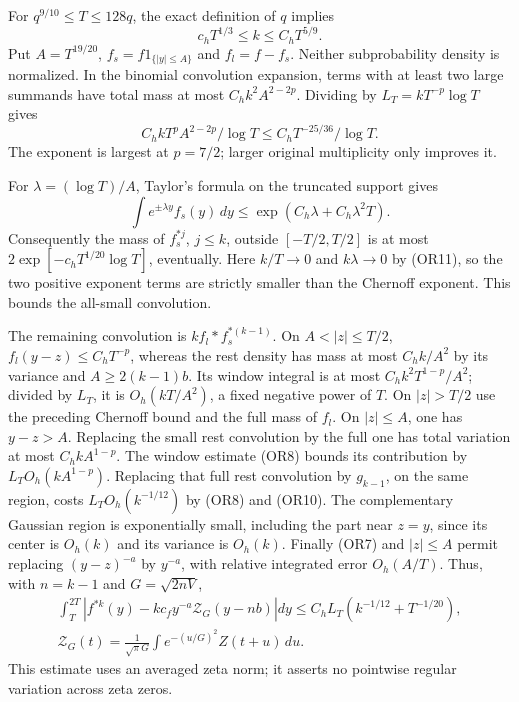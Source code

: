 For \(q^{9/10}\leq T\leq128q\), the exact definition of \(q\) implies
\[
 c_hT^{1/3}\leq k\leq C_hT^{5/9}.                    \tag{OR11}
\]
Put \(A=T^{19/20}\), \(f_s=f1_{\{|y|\leq A\}}\) and \(f_l=f-f_s\).
Neither subprobability density is normalized.  In the binomial
convolution expansion, terms with at least two large summands have
total mass at most \(C_hk^2A^{2-2p}\).  Dividing by
\(L_T=kT^{-p}\log T\) gives
\[
 C_h kT^pA^{2-2p}/\log T
 \leq C_hT^{-25/36}/\log T.                           \tag{OR12}
\]
The exponent is largest at \(p=7/2\); larger original multiplicity
only improves it.

For \(\lambda=(\log T)/A\), Taylor's formula on the truncated support
gives
\[
 \int e^{\pm\lambda y}f_s(y)\,dy
 \leq\exp(C_h\lambda+C_h\lambda^2T).
\]
Consequently the mass of \(f_s^{*j}\), \(j\leq k\), outside
\([-T/2,T/2]\) is at most
\(2\exp[-c_hT^{1/20}\log T]\), eventually.  Here
\(k/T\to0\) and \(k\lambda\to0\) by (OR11), so the two positive
exponent terms are strictly smaller than the Chernoff exponent.
This bounds the all-small convolution.

The remaining convolution is \(k f_l*f_s^{*(k-1)}\).
On \(A<|z|\leq T/2\), \(f_l(y-z)\leq C_hT^{-p}\), whereas the
rest density has mass at most \(C_h k/A^2\) by its variance and
\(A\geq2(k-1)b\).  Its window integral is at most
\(C_hk^2T^{1-p}/A^2\); divided by \(L_T\), it is
\(O_h(kT/A^2)\), a fixed negative power of \(T\).
On \(|z|>T/2\) use the preceding Chernoff bound and the full mass
of \(f_l\).  On \(|z|\leq A\), one has \(y-z>A\).
Replacing the small rest convolution by the full one has total
variation at most \(C_hkA^{1-p}\).  The window estimate (OR8) bounds
its contribution by \(L_TO_h(kA^{1-p})\).
Replacing that full rest convolution by \(g_{k-1}\), on the same
region, costs \(L_TO_h(k^{-1/12})\) by (OR8) and (OR10).
The complementary Gaussian region is exponentially small, including
the part near \(z=y\), since its center is \(O_h(k)\) and its
variance is \(O_h(k)\).
Finally (OR7) and \(|z|\leq A\) permit replacing
\((y-z)^{-a}\) by \(y^{-a}\), with relative integrated error
\(O_h(A/T)\).  Thus, with \(n=k-1\) and \(G=\sqrt{2nV}\),
\[
\begin{gathered}
 \int_T^{2T}\left|f^{*k}(y)-kc_fy^{-a}\mathcal Z_G(y-nb)\right|dy
 \leq C_h L_T(k^{-1/12}+T^{-1/20}),\\
 \mathcal Z_G(t)=\frac1{\sqrt\pi G}\int e^{-(u/G)^2}Z(t+u)\,du .
  \end{gathered}\tag{OR13}
\]
This estimate uses an averaged zeta norm; it asserts no pointwise
regular variation across zeta zeros.


